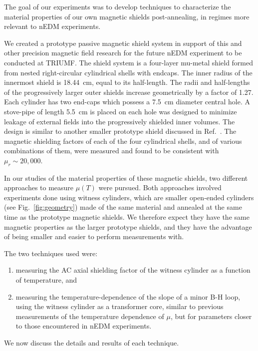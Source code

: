 \documentclass[review]{elsarticle}
\begin{document}
The goal of our experiments was to develop techniques to characterize
the material properties of our own magnetic shields post-annealing, in
regimes more relevant to nEDM experiments.


We created a prototype passive magnetic shield system in support of
this and other precision magnetic field research for the future nEDM
experiment to be conducted at TRIUMF.  The shield system is a
four-layer mu-metal shield formed from nested right-circular
cylindrical shells with endcaps.  The inner radius of the innermost
shield is 18.44~cm, equal to its half-length. The radii and
half-lengths of the progressively larger outer shields increase
geometrically by a factor of 1.27.  Each cylinder has two end-caps
which possess a 7.5~cm diameter central hole.  A stove-pipe of length
5.5~cm is placed on each hole was designed to minimize leakage of
external fields into the progressively shielded inner volumes.  The
design is similar to another smaller prototype shield discussed in
Ref.~\cite{bib:nmorpaper}.  The magnetic shielding factors of each of
the four cylindrical shells, and of various combinations of them, were
measured and found to be consistent with $\mu_r\sim 20,000$.

In our studies of the material properties of these magnetic shields,
two different approaches to measure $\mu(T)$ were pursued.  Both
approaches involved experiments done using witness cylinders, which
are smaller open-ended cylinders (see Fig.~\ref{fig:geometry}) made of
the same material and annealed at the same time as the prototype
magnetic shields.  We therefore expect they have the same magnetic
properties as the larger prototype shields, and they have the
advantage of being smaller and easier to perform measurements with.



The two techniques used were:
\begin{enumerate}
\item measuring the AC axial shielding factor of the witness cylinder
  as a function of temperature, and
\item measuring the temperature-dependence of the slope of a minor B-H
  loop, using the witness cylinder as a transformer core, similar to
  previous measurements of the temperature dependence of $\mu$, but
  for parameters closer to those encountered in nEDM experiments.
\end{enumerate}
We now discuss the details and results of each technique.
\end{document}
